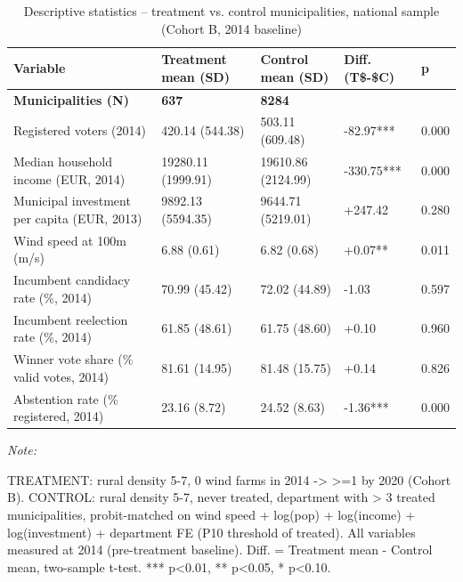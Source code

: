 \begin{table}[!h]
\centering
\caption{\label{tab:table_balance}Descriptive statistics -- treatment vs. control municipalities, national sample (Cohort B, 2014 baseline)}
\centering
\fontsize{9}{11}\selectfont
\begin{threeparttable}
\begin{tabular}[t]{lllll}
\toprule
Variable & Treatment
mean (SD) & Control
mean (SD) & Diff. (T\$-\$C) & p\\
\midrule
\textbf{Municipalities (N)} & \textbf{637} & \textbf{8284} & \textbf{} & \textbf{}\\
Registered voters (2014) & 420.14 (544.38) & 503.11 (609.48) & -82.97*** & 0.000\\
Median household income (EUR, 2014) & 19280.11 (1999.91) & 19610.86 (2124.99) & -330.75*** & 0.000\\
Municipal investment per capita (EUR, 2013) & 9892.13 (5594.35) & 9644.71 (5219.01) & +247.42 & 0.280\\
Wind speed at 100m (m/s) & 6.88 (0.61) & 6.82 (0.68) & +0.07** & 0.011\\
Incumbent candidacy rate (\%, 2014) & 70.99 (45.42) & 72.02 (44.89) & -1.03 & 0.597\\
Incumbent reelection rate (\%, 2014) & 61.85 (48.61) & 61.75 (48.60) & +0.10 & 0.960\\
Winner vote share (\% valid votes, 2014) & 81.61 (14.95) & 81.48 (15.75) & +0.14 & 0.826\\
Abstention rate (\% registered, 2014) & 23.16 (8.72) & 24.52 (8.63) & -1.36*** & 0.000\\
\bottomrule
\end{tabular}
\begin{tablenotes}
\item \textit{Note: } 
\item TREATMENT: rural density 5-7, 0 wind farms in 2014 -> >=1 by 2020 (Cohort B). CONTROL: rural density 5-7, never treated, department with > 3 treated municipalities, probit-matched on wind speed + log(pop) + log(income) + log(investment) + department FE (P10 threshold of treated). All variables measured at 2014 (pre-treatment baseline). Diff. = Treatment mean - Control mean, two-sample t-test. *** p<0.01, ** p<0.05, * p<0.10.
\end{tablenotes}
\end{threeparttable}
\end{table}
